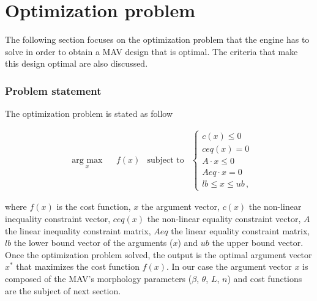\section{Optimization problem}
\label{sec:optimization_problem}
The following section focuses on the optimization problem that the engine has to
solve in order to obtain a MAV design that is optimal. The criteria that make
this design optimal are also discussed.

\subsubsection{Problem statement}
\label{sec:problem}
 The optimization problem is stated as follow

\begin{equation}
  \label{opt_pb}
  \begin{aligned}
    & \underset{x}{\text{arg max}}
    & & f(x) &\text{subject to} &
    \begin{cases}
      c(x) \leq 0 \\
      ceq(x) = 0 \\
      A\cdot x \leq 0 \\
      Aeq \cdot x = 0 \\
      lb \leq x \leq ub\, ,
    \end{cases}
  \end{aligned}
\end{equation}

where $f(x)$ is the cost function, $x$ the argument vector, $c(x)$
the non-linear inequality constraint vector, $ceq(x)$ the non-linear equality
constraint vector, $A$ the linear inequality constraint matrix, $Aeq$ the linear
equality constraint matrix, $lb$ the lower bound vector of the arguments ($x$)
and $ub$ the upper bound vector.\\
Once the optimization problem solved, the output is the optimal argument vector
$x^*$ that maximizes the cost function $f(x)$. In our case the argument vector
$x$ is composed of the MAV's morphology parameters ($\beta$, $\theta$, $L$, $n$)
and cost functions are the subject of next section.

